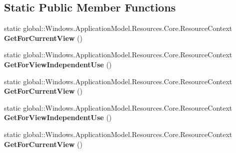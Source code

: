 \subsection*{Static Public Member Functions}
\begin{DoxyCompactItemize}
\item 
\mbox{\label{class_windows_1_1_application_model_1_1_resources_1_1_core_1_1_resource_context_aa88e2dab7f50d766e021aa2285842ab4}} 
static global\+::\+Windows.\+Application\+Model.\+Resources.\+Core.\+Resource\+Context {\bfseries Get\+For\+Current\+View} ()
\item 
\mbox{\label{class_windows_1_1_application_model_1_1_resources_1_1_core_1_1_resource_context_a8c7c08decba86df5cca25a8d940e9c44}} 
static global\+::\+Windows.\+Application\+Model.\+Resources.\+Core.\+Resource\+Context {\bfseries Get\+For\+View\+Independent\+Use} ()
\item 
\mbox{\label{class_windows_1_1_application_model_1_1_resources_1_1_core_1_1_resource_context_aa88e2dab7f50d766e021aa2285842ab4}} 
static global\+::\+Windows.\+Application\+Model.\+Resources.\+Core.\+Resource\+Context {\bfseries Get\+For\+Current\+View} ()
\item 
\mbox{\label{class_windows_1_1_application_model_1_1_resources_1_1_core_1_1_resource_context_a8c7c08decba86df5cca25a8d940e9c44}} 
static global\+::\+Windows.\+Application\+Model.\+Resources.\+Core.\+Resource\+Context {\bfseries Get\+For\+View\+Independent\+Use} ()
\item 
\mbox{\label{class_windows_1_1_application_model_1_1_resources_1_1_core_1_1_resource_context_aa88e2dab7f50d766e021aa2285842ab4}} 
static global\+::\+Windows.\+Application\+Model.\+Resources.\+Core.\+Resource\+Context {\bfseries Get\+For\+Current\+View} ()
\item 
\mbox{\label{class_windows_1_1_application_model_1_1_resources_1_1_core_1_1_resource_context_a8c7c08decba86df5cca25a8d940e9c44}} 

\end{DoxyCompactItemize}
